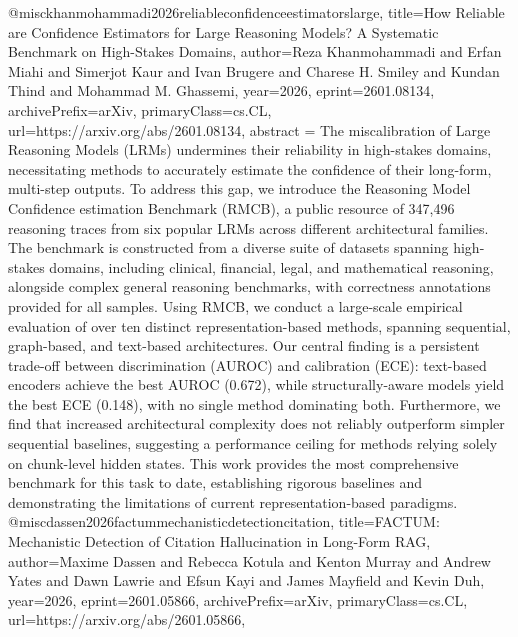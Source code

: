 {}@misc{khanmohammadi2026reliableconfidenceestimatorslarge,
      title={How Reliable are Confidence Estimators for Large Reasoning Models? A Systematic Benchmark on High-Stakes Domains}, 
      author={Reza Khanmohammadi and Erfan Miahi and Simerjot Kaur and Ivan Brugere and Charese H. Smiley and Kundan Thind and Mohammad M. Ghassemi},
      year={2026},
      eprint={2601.08134},
      archivePrefix={arXiv},
      primaryClass={cs.CL},
      url={https://arxiv.org/abs/2601.08134},
      abstract = {The miscalibration of Large Reasoning Models (LRMs) undermines their reliability in high-stakes domains, necessitating methods to accurately estimate the confidence of their long-form, multi-step outputs. To address this gap, we introduce the Reasoning Model Confidence estimation Benchmark (RMCB), a public resource of 347,496 reasoning traces from six popular LRMs across different architectural families. The benchmark is constructed from a diverse suite of datasets spanning high-stakes domains, including clinical, financial, legal, and mathematical reasoning, alongside complex general reasoning benchmarks, with correctness annotations provided for all samples. Using RMCB, we conduct a large-scale empirical evaluation of over ten distinct representation-based methods, spanning sequential, graph-based, and text-based architectures. Our central finding is a persistent trade-off between discrimination (AUROC) and calibration (ECE): text-based encoders achieve the best AUROC (0.672), while structurally-aware models yield the best ECE (0.148), with no single method dominating both. Furthermore, we find that increased architectural complexity does not reliably outperform simpler sequential baselines, suggesting a performance ceiling for methods relying solely on chunk-level hidden states. This work provides the most comprehensive benchmark for this task to date, establishing rigorous baselines and demonstrating the limitations of current representation-based paradigms.}
}@misc{dassen2026factummechanisticdetectioncitation,
      title={FACTUM: Mechanistic Detection of Citation Hallucination in Long-Form RAG}, 
      author={Maxime Dassen and Rebecca Kotula and Kenton Murray and Andrew Yates and Dawn Lawrie and Efsun Kayi and James Mayfield and Kevin Duh},
      year={2026},
      eprint={2601.05866},
      archivePrefix={arXiv},
      primaryClass={cs.CL},
      url={https://arxiv.org/abs/2601.05866},
}
